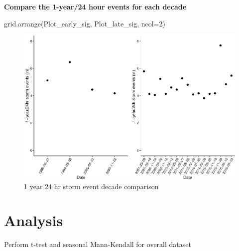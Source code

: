 \documentclass[
  12pt,
]{article}
\newenvironment{Shaded}{\begin{snugshade}}{\end{snugshade}}
\newcommand{\AttributeTok}[1]{\textcolor[rgb]{0.77,0.63,0.00}{#1}}
\newcommand{\DecValTok}[1]{\textcolor[rgb]{0.00,0.00,0.81}{#1}}
\newcommand{\FunctionTok}[1]{\textcolor[rgb]{0.00,0.00,0.00}{#1}}
\newcommand{\NormalTok}[1]{#1}
\newcommand{\SpecialCharTok}[1]{\textcolor[rgb]{0.00,0.00,0.00}{#1}}
\begin{document}
\textbf{Compare the 1-year/24 hour events for each decade}

\begin{Shaded}
\begin{Highlighting}[]
\FunctionTok{grid.arrange}\NormalTok{(Plot\_early\_sig, Plot\_late\_sig, }\AttributeTok{ncol=}\DecValTok{2}\NormalTok{)}
\end{Highlighting}
\end{Shaded}

\begin{figure}

{\centering \includegraphics{Final_Project_Thornton_Katayama_Ngenzi_files/figure-latex/combined one year storms-1} 

}

\caption{1 year 24 hr storm event decade comparison}\label{fig:combined one year storms}
\end{figure}

\newpage

\hypertarget{analysis}{%
\section{Analysis}\label{analysis}}

Perform t-test and seasonal Mann-Kendall for overall dataset

\begin{Shaded}
\end{Shaded}
\end{document}
